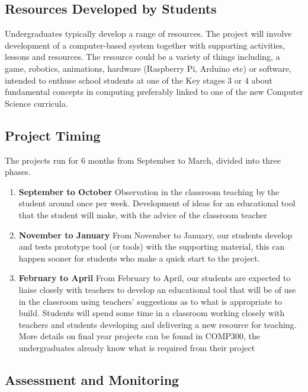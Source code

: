 \documentclass[
  12pt,
]{book}
\providecommand{\tightlist}{%
  \setlength{\itemsep}{0pt}\setlength{\parskip}{0pt}}
\begin{document}
\hypertarget{resources}{%
\subsection{Resources Developed by Students}\label{resources}}

Undergraduates typically develop a range of resources. The project will involve development of a computer-based system together with supporting activities, lessons and resources. The resource could be a variety of things including, a game, robotics, animations, hardware (Raspberry Pi, Arduino etc) or software, intended to enthuse school students at one of the Key stages 3 or 4 about fundamental concepts in computing preferably linked to one of the new Computer Science curricula.

\hypertarget{timing}{%
\subsection{Project Timing}\label{timing}}

The projects run for 6 months from September to March, divided into three phases.

\begin{enumerate}
\def\labelenumi{\arabic{enumi}.}
\tightlist
\item
  \textbf{September to October} Observation in the classroom teaching by the student around once per week. Development of ideas for an educational tool that the student will make, with the advice of the classroom teacher
\item
  \textbf{November to January} From November to January, our students develop and tests prototype tool (or tools) with the supporting material, this can happen sooner for students who make a quick start to the project.
\item
  \textbf{February to April} From February to April, our students are expected to liaise closely with teachers to develop an educational tool that will be of use in the classroom using teachers' suggestions as to what is appropriate to build. Students will spend some time in a classroom working closely with teachers and students developing and delivering a new resource for teaching. More details on final year projects can be found in COMP300, the undergraduates already know what is required from their project
\end{enumerate}

\hypertarget{assessment}{%
\subsection{Assessment and Monitoring}\label{assessment}}
\end{document}
